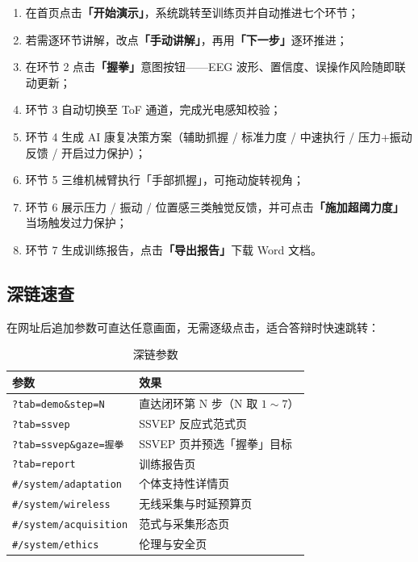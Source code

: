\documentclass[11pt, a4paper]{ctexart}
\begin{document}
\begin{enumerate}[itemsep=3pt, topsep=4pt]
  \item 在首页点击\textbf{「开始演示」}，系统跳转至训练页并自动推进七个环节；
  \item 若需逐环节讲解，改点\textbf{「手动讲解」}，再用\textbf{「下一步」}逐环推进；
  \item 在环节 2 点击\textbf{「握拳」}意图按钮——EEG 波形、置信度、误操作风险随即联动更新；
  \item 环节 3 自动切换至 ToF 通道，完成光电感知校验；
  \item 环节 4 生成 AI 康复决策方案（辅助抓握 / 标准力度 / 中速执行 / 压力+振动反馈 / 开启过力保护）；
  \item 环节 5 三维机械臂执行「手部抓握」，可拖动旋转视角；
  \item 环节 6 展示压力 / 振动 / 位置感三类触觉反馈，并可点击\textbf{「施加超阈力度」}当场触发过力保护；
  \item 环节 7 生成训练报告，点击\textbf{「导出报告」}下载 Word 文档。
\end{enumerate}

\subsection{深链速查}

在网址后追加参数可直达任意画面，无需逐级点击，适合答辩时快速跳转：

\begin{table}[htbp]
\centering
\caption{深链参数}
\begin{tabularx}{\textwidth}{@{}l X@{}}
\toprule
\sffamily\bfseries 参数 & \sffamily\bfseries 效果 \\
\midrule
\texttt{?tab=demo\&step=N}   & 直达闭环第 N 步（N 取 $1\sim 7$） \\
\texttt{?tab=ssvep}          & SSVEP 反应式范式页 \\
\texttt{?tab=ssvep\&gaze=握拳} & SSVEP 页并预选「握拳」目标 \\
\texttt{?tab=report}         & 训练报告页 \\
\texttt{\#/system/adaptation} & 个体支持性详情页 \\
\texttt{\#/system/wireless}   & 无线采集与时延预算页 \\
\texttt{\#/system/acquisition} & 范式与采集形态页 \\
\texttt{\#/system/ethics}     & 伦理与安全页 \\
\bottomrule
\end{tabularx}
\end{table}
\end{document}
